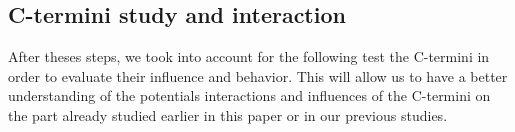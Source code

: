 \documentclass[a4paper]{article}
\begin{document}
\subsection{C-termini study and interaction}

After theses steps, we took into account for the following test the C-termini in order to evaluate their 
influence and behavior. This will allow us to have a better understanding of the potentials interactions and 
influences of the C-termini on the part already studied earlier in this paper or in our previous studies.


%
%
%
%
%
%
%
%
%
\end{document}
